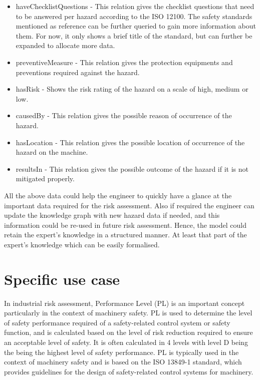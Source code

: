 \begin{itemize}
    \item haveChecklistQuestions - This relation gives the checklist questions that need to be answered per hazard according to the ISO 12100. The safety standards mentioned as reference can be further queried to gain more information about them. For now, it only shows a brief title of the standard, but can further be expanded to allocate more data.
    \item preventiveMeasure - This relation gives the protection equipments and preventions required against the hazard. 
    \item hasRisk - Shows the risk rating of the hazard on a scale of high, medium or low.
    \item causedBy - This relation gives the possible reason of occurrence of the hazard.
    \item hasLocation - This relation gives the possible location of occurrence of the hazard on the machine.
    \item resultsIn - This relation gives the possible outcome of the hazard if it is not mitigated properly.
\end{itemize}

All the above data could help the engineer to quickly have a glance at the important data required for the risk assessment. Also if required the engineer can update the knowledge graph with new hazard data if needed, and this information could be re-used in future risk assessment. Hence, the model could retain the expert's knowledge in a structured manner. At least that part of the expert's knowledge which can be easily formalised. 

\section{Specific use case} \label{specific_use}
In industrial risk assessment, Performance Level (PL) is an important concept particularly in the context of machinery safety. PL is used to determine the level of safety performance required of a safety-related control system or safety function, and is calculated based on the level of risk reduction required to ensure an acceptable level of safety. It is often calculated in 4 levels with level D being the being the highest level of safety performance. PL is typically used in the context of machinery safety and is based on the ISO 13849-1 standard, which provides guidelines for the design of safety-related control systems for machinery. %

